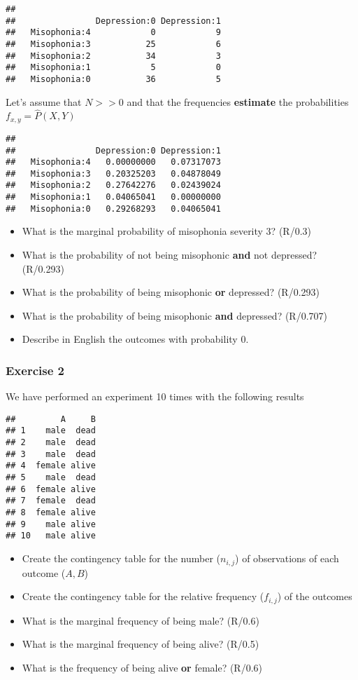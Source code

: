 \documentclass[
]{book}
\providecommand{\tightlist}{%
  \setlength{\itemsep}{0pt}\setlength{\parskip}{0pt}}
\begin{document}
\begin{verbatim}
##               
##                Depression:0 Depression:1
##   Misophonia:4            0            9
##   Misophonia:3           25            6
##   Misophonia:2           34            3
##   Misophonia:1            5            0
##   Misophonia:0           36            5
\end{verbatim}

Let's assume that \(N>>0\) and that the frequencies \textbf{estimate} the probabilities \(f_{x,y}=\hat{P}(X, Y)\)

\begin{verbatim}
##               
##                Depression:0 Depression:1
##   Misophonia:4   0.00000000   0.07317073
##   Misophonia:3   0.20325203   0.04878049
##   Misophonia:2   0.27642276   0.02439024
##   Misophonia:1   0.04065041   0.00000000
##   Misophonia:0   0.29268293   0.04065041
\end{verbatim}

\begin{itemize}
\tightlist
\item
  What is the marginal probability of misophonia severity 3? (R/0.3)
\item
  What is the probability of not being misophonic \textbf{and} not depressed? (R/0.293)
\item
  What is the probability of being misophonic \textbf{or} depressed? (R/0.293)
\item
  What is the probability of being misophonic \textbf{and} depressed? (R/0.707)
\item
  Describe in English the outcomes with probability 0.
\end{itemize}

\hypertarget{exercise-2-1}{%
\subsubsection{Exercise 2}\label{exercise-2-1}}

We have performed an experiment 10 times with the following results

\begin{verbatim}
##         A     B
## 1    male  dead
## 2    male  dead
## 3    male  dead
## 4  female alive
## 5    male  dead
## 6  female alive
## 7  female  dead
## 8  female alive
## 9    male alive
## 10   male alive
\end{verbatim}

\begin{itemize}
\tightlist
\item
  Create the contingency table for the number (\(n_{i,j}\)) of observations of each outcome (\(A,B\))
\item
  Create the contingency table for the relative frequency (\(f_{i,j}\)) of the outcomes
\item
  What is the marginal frequency of being male? (R/0.6)
\item
  What is the marginal frequency of being alive? (R/0.5)
\item
  What is the frequency of being alive \textbf{or} female? (R/0.6)
\end{itemize}
\end{document}
